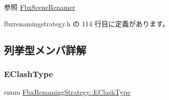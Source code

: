 \begin{DoxySeeAlso}{参照}
\hyperlink{class_fbx_scene_renamer}{Fbx\+Scene\+Renamer} 
\end{DoxySeeAlso}


 fbxrenamingstrategy.\+h の 114 行目に定義があります。



\subsection{列挙型メンバ詳解}
\mbox{\label{class_fbx_renaming_strategy_aacebe214cec13a6cdbbc9e40d16c57dd}} 
\subsubsection{\texorpdfstring{E\+Clash\+Type}{EClashType}}
{\footnotesize\ttfamily enum \hyperlink{class_fbx_renaming_strategy_aacebe214cec13a6cdbbc9e40d16c57dd}{Fbx\+Renaming\+Strategy\+::\+E\+Clash\+Type}}


